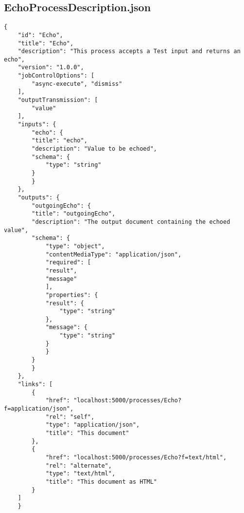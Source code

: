 \subsection{EchoProcessDescription.json}
\begin{lstlisting}[caption={EchoProcessDescription.json}, style = JSON]
{
    "id": "Echo",
    "title": "Echo",
    "description": "This process accepts a Test input and returns an echo",
    "version": "1.0.0",
    "jobControlOptions": [
        "async-execute", "dismiss"
    ],
    "outputTransmission": [
        "value"
    ],
    "inputs": {
        "echo": {
        "title": "echo",
        "description": "Value to be echoed",
        "schema": {
            "type": "string"
        }
        }
    },
    "outputs": {
        "outgoingEcho": {
        "title": "outgoingEcho",
        "description": "The output document containing the echoed value",
        "schema": {
            "type": "object",
            "contentMediaType": "application/json",
            "required": [
            "result",
            "message"
            ],
            "properties": {
            "result": {
                "type": "string"
            },
            "message": {
                "type": "string"
            }
            }
        }
        }
    },
    "links": [
        {
            "href": "localhost:5000/processes/Echo?f=application/json",
            "rel": "self",
            "type": "application/json",
            "title": "This document"
        },
        {
            "href": "localhost:5000/processes/Echo?f=text/html",
            "rel": "alternate",
            "type": "text/html",
            "title": "This document as HTML"
        }
    ]
    }     
\end{lstlisting}\label{RessourceEchoProcessDescriptionJSON}  

